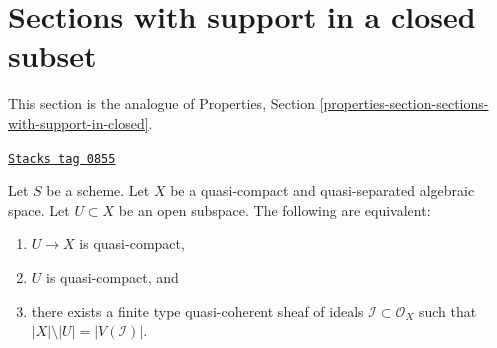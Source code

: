 \section{Sections with support in a closed subset}
\label{spaces-limits-section-sections-with-support-in-closed}
This section is the analogue of
Properties, Section \ref{properties-section-sections-with-support-in-closed}.

\begin{lemma}
\label{spaces-limits-lemma-quasi-coherent-finite-type-ideals}
\href{https://stacks.math.columbia.edu/tag/0855}{\texttt{Stacks tag 0855}}

Let $S$ be a scheme.
Let $X$ be a quasi-compact and quasi-separated algebraic space.
Let $U \subset X$ be an open subspace. The following are equivalent:
\begin{enumerate}
\item $U \to X$ is quasi-compact,
\item $U$ is quasi-compact, and
\item there exists a finite type quasi-coherent sheaf of ideals
$\mathcal{I} \subset \mathcal{O}_X$ such that
$|X| \setminus |U| = |V(\mathcal{I})|$.
\end{enumerate}
\end{lemma}

